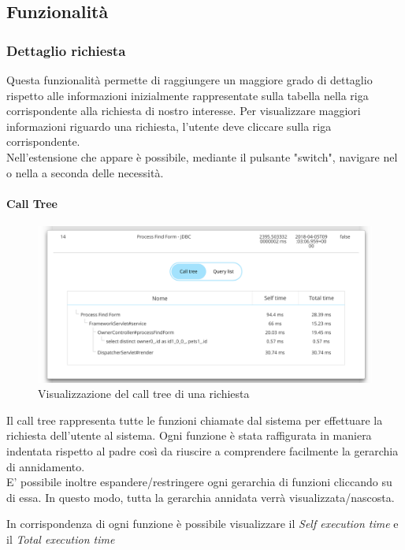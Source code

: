 \subsection{Funzionalità}
\subsubsection {Dettaglio richiesta}
Questa funzionalità permette di raggiungere un maggiore grado di dettaglio rispetto alle informazioni inizialmente rappresentate sulla tabella nella riga corrispondente alla richiesta di nostro interesse.
Per visualizzare maggiori informazioni riguardo una richiesta, l'utente deve cliccare sulla riga corrispondente.
\\Nell'estensione che appare è possibile, mediante il pulsante "switch", navigare nel  o nella  a seconda delle necessità.

\paragraph {Call Tree} \Spazio
\begin{figure}[H]
	\centering 
	\includegraphics[width=1\textwidth]{Images/calltree}
	\caption{Visualizzazione del call tree di una richiesta}
\end{figure}
Il call tree rappresenta tutte le funzioni chiamate dal sistema per effettuare la richiesta dell'utente al sistema.
Ogni funzione è stata raffigurata in maniera indentata rispetto al padre così da riuscire a comprendere facilmente la gerarchia di annidamento.\\
E' possibile inoltre espandere/restringere ogni gerarchia di funzioni cliccando su di essa. In questo modo, tutta la gerarchia annidata verrà visualizzata/nascosta.

In corrispondenza di ogni funzione è possibile visualizzare il \emph{Self execution time} e il \emph{Total execution time}
\\

